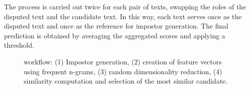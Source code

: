 The process is carried out twice for each pair of texts, swapping the roles of the disputed text and the candidate text. 
In this way, each text serves once as the disputed text and once as the reference for impostor generation. 
The final prediction is obtained by averaging the aggregated scores and applying a threshold.


\begin{figure}[htbp]
    \centering
    
    \caption[\impAppr{} workflow.]{\impAppr{} workflow: (1) Impostor generation, (2) creation of feature vectors using frequent n-grams, (3) random dimensionality reduction, (4) similarity computation and selection of the most similar candidate.}
    \label{fig:impostor}
\end{figure}






%     


